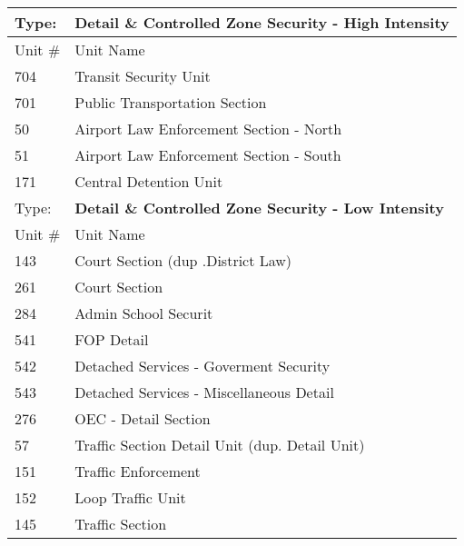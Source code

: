 \begin{table}
\tiny
\centering
\caption{}\label{tab:controlzone}
\begin{tabular}{|ll|}
\hline
Type:	&\textbf{Detail \& Controlled Zone Security - High Intensity}\\ 
\hline
Unit \#	&Unit Name \\
\hline
704	&Transit Security Unit\\	
701	&Public Transportation Section \\
50	&Airport Law Enforcement Section - North \\ 
51	&Airport Law Enforcement Section - South \\
171	&Central Detention Unit	\\ 
\hline
Type:	&\textbf{Detail \& Controlled Zone Security - Low Intensity}\\ 
\hline
Unit \#	&Unit Name \\
\hline
143	&Court Section (dup .District Law)\\
261	&Court Section\\
284	&Admin School Securit\\
541	&FOP Detail\\
542	&Detached Services - Goverment Security\\
543	&Detached Services - Miscellaneous Detail\\
276	&OEC - Detail Section\\
57	&Traffic Section Detail Unit (dup. Detail Unit)\\
151	&Traffic Enforcement\\
152	&Loop Traffic Unit\\
145	&Traffic Section\\
\hline
\end{tabular}
\end{table}

